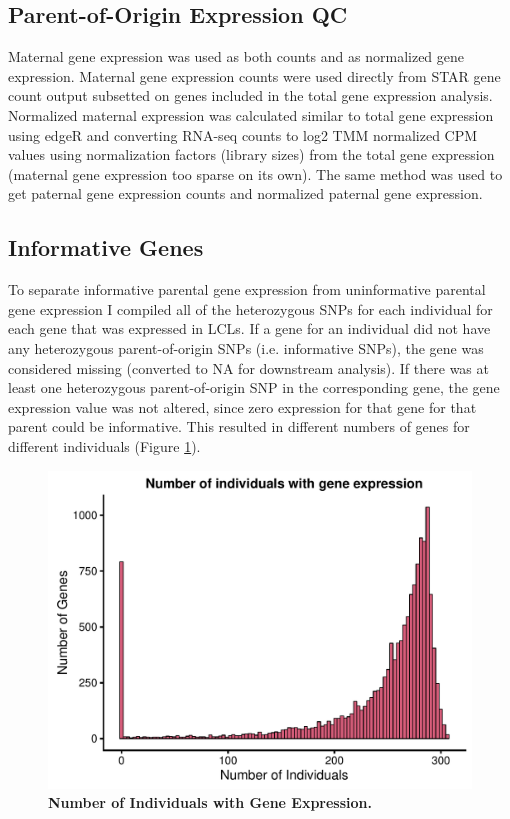 \subsection{Parent-of-Origin Expression QC}\label{Parent-of-Origin Expression QC}
Maternal gene expression was used as both counts and as normalized gene expression. Maternal gene expression counts were used directly from STAR gene count output\cite{Dobin:2002by} subsetted on genes included in the total gene expression analysis. 
Normalized maternal expression was calculated similar to total gene expression using edgeR and converting RNA-seq counts to log2 TMM normalized CPM values using normalization factors (library sizes) from the total gene expression (maternal gene expression too sparse on its own). The same method was used to get paternal gene expression counts and normalized paternal gene expression.

\subsection{Informative Genes}\label{Informative Genes}
To separate informative parental gene expression from uninformative parental gene expression I compiled all of the heterozygous SNPs for each individual for each gene that was expressed in LCLs. If a gene for an individual did not have any heterozygous parent-of-origin SNPs (i.e. informative SNPs), the gene was considered missing (converted to NA for downstream analysis). If there was at least one heterozygous parent-of-origin SNP in the corresponding gene, the gene expression value was not altered, since zero expression for that gene for that parent could be informative. This resulted in different numbers of genes for different individuals (Figure \ref{fig:indspergene}).

\begin{figure}[!htb]
\centering \includegraphics[width=5in]{img/ch04/fig-08-individualspergene.pdf}
\caption[Number of Individuals with Gene Expression.]{\textbf{Number of Individuals with Gene Expression.} }
\label{fig:indspergene}
\end{figure}
\clearpage


